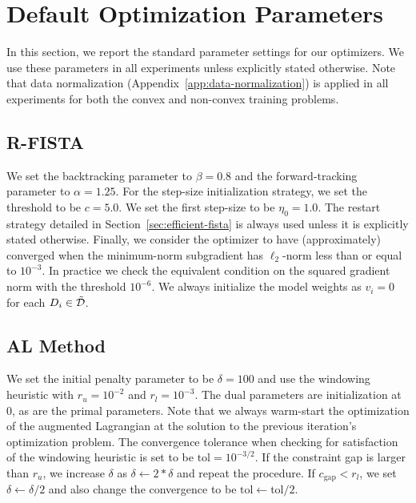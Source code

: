 
\section{Default Optimization Parameters}\label{app:default-parameters}

In this section, we report the standard parameter settings for our optimizers.
We use these parameters in all experiments unless explicitly stated otherwise.
Note that data normalization (Appendix~\ref{app:data-normalization}) is applied in all experiments for both the convex and non-convex training problems.

\subsection{R-FISTA}

We set the backtracking parameter to \( \beta = 0.8 \) and the forward-tracking parameter to \( \alpha = 1.25 \).
For the step-size initialization strategy, we set the threshold to be \( c = 5.0 \).
We set the first step-size to be \( \eta_0 = 1.0 \).
The restart strategy detailed in Section~\ref{sec:efficient-fista} is always used unless it is explicitly stated otherwise.
Finally, we consider the optimizer to have (approximately) converged when the minimum-norm subgradient has \( \ell_2 \)-norm less than or equal to \( 10^{-3} \).
In practice we check the equivalent condition on the squared gradient norm with the threshold \( 10^{-6} \).
We always initialize the model weights as \( v_i = 0 \) for each \( D_i \in \tilde {\mathcal{D}} \).

\subsection{AL Method}

We set the initial penalty parameter to be \( \delta = 100 \) and use the windowing heuristic with \( r_u = 10^{-2} \) and \( r_l = 10^{-3} \).
The dual parameters are initialization at \( 0 \), as are the primal parameters.
Note that we always warm-start the optimization of the augmented Lagrangian at the solution to the previous iteration's optimization problem.
The convergence tolerance when checking for satisfaction of the windowing heuristic is set to be \( \text{tol} = 10^{-3/2} \).
If the constraint gap is larger than \( r_u \), we increase \( \delta \) as \( \delta \gets 2 * \delta \) and repeat the procedure.
If \( c_{\text{gap}} < r_l \), we set \( \delta \gets \delta / 2 \) and also change the convergence to be \( \text{tol} \gets \text{tol} / 2 \).

